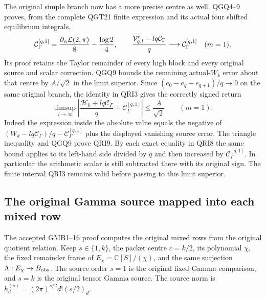 The original simple branch now has a more precise centre as well.
QGQ4--9 proves, from the complete QGT21 finite expression and its
actual four shifted equilibrium integrals,
\[
 \mathcal C_\Gamma^{[q,1]}
       =\frac{\partial_\alpha\mathcal L(2,\pi)}8
                            -\frac{\log2}{4},\qquad
 \frac{\mathcal V^{\rm c}_{q,l}-lq\mathcal C_\Gamma}{q}
                            \longrightarrow\mathcal C_\Gamma^{[q,1]}
 \quad(m=1).
\]
Its proof retains the Taylor remainder of every high block and
every original source and scalar correction. QGQ9 bounds the
remaining actual-$W_k$ error about that centre by $A/\sqrt2$
in the limit superior. Since
$(e_0-e_q-e_{q+1})/q\to0$ on the same original branch, the
identity in QRI3 gives the correctly signed return
\[
 \boxed{\displaystyle
 \limsup_{l\to\infty}
 \left|\frac{\mathcal H_k+lq\mathcal C_\Gamma}{q}
                         +\mathcal C_\Gamma^{[q,1]}\right|
                \le\frac A{\sqrt2}\qquad(m=1).}
 \tag{QRI9}
\]
Indeed the expression inside the absolute value equals the
negative of
$(W_k-lq\mathcal C_\Gamma)/q-\mathcal C_\Gamma^{[q,1]}$
plus the displayed vanishing source error. The triangle inequality
and QGQ9 prove QRI9. By each exact equality in QRI8 the same bound
applies to its left-hand side divided by $q$ and then increased
by $\mathcal C_\Gamma^{[q,1]}$. In particular the arithmetic scalar
is still subtracted there with its original sign. The finite
interval QRI3 remains valid before passing to this limit superior.

\subsection{The original Gamma source mapped into each mixed row}

The accepted GMB1--16 proof computes the original mixed rows from
the original quotient relation. Keep $s\in\{1,k\}$, the packet
centre $c=k/2$, its polynomial $\chi$, the fixed remainder frame
of $E_\chi=\mathbb C[S]/(\chi)$, and the same surjection
$\Lambda:E_\chi\to B_{\rm obs}$. The source order $s=1$ is
the original fixed Gamma comparison, and $s=k$ is the original
tensor Gamma source. The source norm is
$h_d^{(s)}=(2\pi)^{s/2}d!(s/2)_d$.

